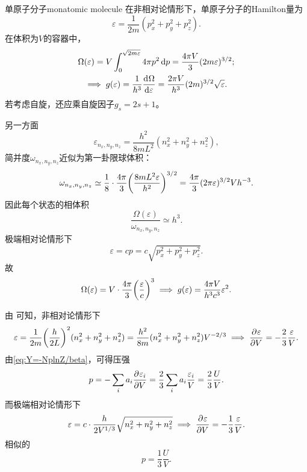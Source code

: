 \begin{example}{单原子分子}{monatomic molecule}
	在非相对论情形下，单原子分子的Hamilton量为
	\[
		\varepsilon=\frac1{2m}(p_x^2+p_y^2+p_z^2).
	\]
	在体积为$V$的容器中，
	\begin{gather}\notag
		\Omega(\varepsilon)=V\int_0^{\sqrt{2m\varepsilon}}4\pi p^2\mathop{}\!\mathrm{d} p=\frac{4\pi V}3(2m\varepsilon)^{3/2};\\
		\implies
		g(\varepsilon)=\frac1{h^3}\frac{\mathrm{d}^{{}}\Omega}{\mathrm{d}{\varepsilon}^{{}}}=\frac{2\pi V}{h^3}(2m)^{3/2}\sqrt\varepsilon.
	\end{gather}
	若考虑自旋，还应乘自旋因子$g_s=2s+1$。

	另一方面
	\[
		\varepsilon_{n_x,n_y,n_z}=\frac{h^2}{8mL^2}(n_x^2+n_y^2+n_z^2),
	\]
	简并度$\omega_{n_x,n_y,n_z}$近似为第一卦限球体积：
	\[
		\omega_{n_x,n_y,n_z}\simeq\frac18\cdot\frac{4\pi}3\biggl(\frac{8mL^2\varepsilon}{h^2}\biggr)^{3/2}=\frac{4\pi}{3}(2\pi\varepsilon)^{3/2}Vh^{-3}.
	\]
	因此每个状态的相体积
	\[
		\frac{\Omega(\varepsilon)}{\omega_{n_x,n_y,n_z}}\simeq h^3.
	\]
	\tcblower
	极端相对论情形下
	\[
		\varepsilon=cp=c\sqrt{p_x^2+p_y^2+p_z^2}.
	\]
	故
	\begin{equation}
		\Omega(\varepsilon)=V\cdot\frac{4\pi}3\biggl(\frac\varepsilon{c}\biggr)^3
		\implies
		g(\varepsilon)=\frac{4\pi V}{h^3c^3}\varepsilon^2.
	\end{equation}
\end{example}
\begin{corollary}
	由 可知，非相对论情形下
	\[
		\varepsilon=\frac1{2m}\biggl(\frac h{2L}\biggr)^2(n_x^2+n_y^2+n_z^2)=\frac{h^2}{8m}(n_x^2+n_y^2+n_z^2)V^{-2/3}
		\implies
		\frac{\partial^{{}}\varepsilon}{\partial{V}^{{}}}=-\frac23\frac\varepsilon V.
	\]
	由\eqref{eq:Y=-NplnZ/beta}，可得压强
	\begin{equation}
		p=-\sum_i a_i\frac{\partial^{{}}\varepsilon_i}{\partial{V}^{{}}}=\frac23\sum_i a_i\frac{\varepsilon_i}V=\frac23\frac UV.
	\end{equation}
	而极端相对论情形下
	\[
		\varepsilon=c\cdot\frac h{2V^{1/3}}\sqrt{n_x^2+n_y^2+n_z^2}
		\implies
		\frac{\partial^{{}}\varepsilon}{\partial{V}^{{}}}=-\frac13\frac\varepsilon V.
	\]
	相似的
	\begin{equation}
		p=\frac13\frac UV.
	\end{equation}
\end{corollary}